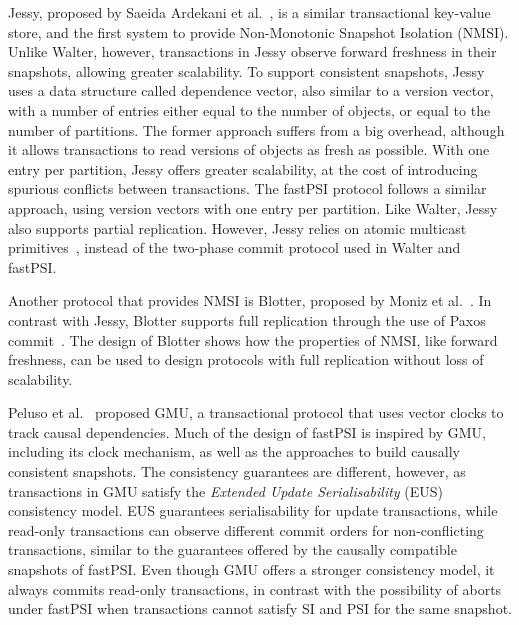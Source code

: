 
Jessy, proposed by Saeida Ardekani et al.~\citep{ardekani_nmsi}, is a similar transactional key-value store, and the first system to provide Non-Monotonic Snapshot Isolation (NMSI). Unlike Walter, however, transactions in Jessy observe forward freshness in their snapshots, allowing greater scalability. To support consistent snapshots, Jessy uses a data structure called dependence vector, also similar to a version vector, with a number of entries either equal to the number of objects, or equal to the number of partitions. The former approach suffers from a big overhead, although it allows transactions to read versions of objects as fresh as possible. With one entry per partition, Jessy offers greater scalability, at the cost of introducing spurious conflicts between transactions. The fastPSI protocol follows a similar approach, using version vectors with one entry per partition. Like Walter, Jessy also supports partial replication. However, Jessy relies on atomic multicast primitives~\citep{guerraoui_multicast}, instead of the two-phase commit protocol used in Walter and fastPSI.

Another protocol that provides NMSI is Blotter, proposed by Moniz et al.~\citep{moniz_blotter}. In contrast with Jessy, Blotter supports full replication through the use of Paxos commit~\citep{gray_paxos_commit}. The design of Blotter shows how the properties of NMSI, like forward freshness, can be used to design protocols with full replication without loss of scalability.

Peluso et al.~\citep{peluso_gmu} proposed GMU, a transactional protocol that uses vector clocks to track causal dependencies. Much of the design of fastPSI is inspired by GMU, including its clock mechanism, as well as the approaches to build causally consistent snapshots. The consistency guarantees are different, however, as transactions in GMU satisfy the \emph{Extended Update Serialisability} (EUS)~\citep{hansdah_update_ser, adya_thesis} consistency model. EUS guarantees serialisability for update transactions, while read-only transactions can observe different commit orders for non-conflicting transactions, similar to the guarantees offered by the causally compatible snapshots of fastPSI. Even though GMU offers a stronger consistency model, it always commits read-only transactions, in contrast with the possibility of aborts under fastPSI when transactions cannot satisfy SI and PSI for the same snapshot.
